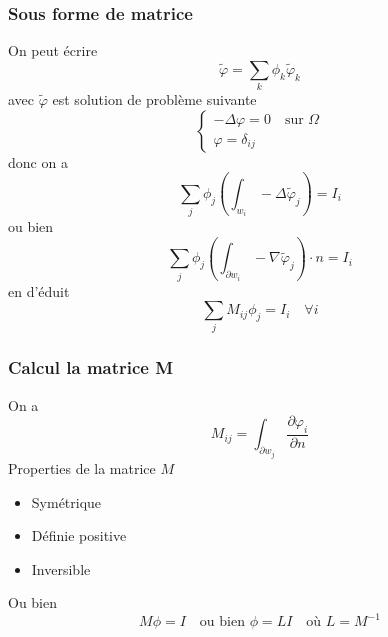 \begin{frame}
\frametitle{Sous forme de matrice}
On peut \'ecrire
 \begin{equation}
   \tilde\varphi = \sum_k \phi_k \tilde{\varphi}_k
 \end{equation}
 avec $\tilde{\varphi}$ est solution de probl\`eme suivante
 \begin{equation}
   \label{eq:2}
 \begin{cases}
 -\Delta{\varphi} = 0 \quad \text{sur } \Omega \\
 {\varphi} = \delta_{ij}
 \end{cases}
 \end{equation}
 donc on a
 \begin{equation}
 \sum_j \phi_j \left( \int_{w_i}-\Delta\tilde{\varphi}_j \right) =I_i
 \end{equation}
 ou bien
 \begin{equation}
  \sum_j \phi_j \left( \int_{\partial w_i}-\nabla\tilde{\varphi}_j \right) \cdot n =I_i
 \end{equation}
 en d'\'eduit
  \begin{equation}
  \sum_j M_{ij}\phi_j =I_i \quad \forall i
 \end{equation}
%


\end{frame}

 \begin{frame}
\frametitle{Calcul la matrice M}
On a
\begin{equation}
  \label{eq:3}
  M_{ij} = \int_{\partial w_j} \frac{\partial\varphi_i}{\partial n}
\end{equation}
 Properties de la matrice $M$
 \begin{itemize}
 \item Sym\'etrique
 \item D\'efinie positive
 \item Inversible
 \end{itemize}
 Ou bien
\begin{equation}
  \label{eq:4}
  M\phi =I \quad \text{ou bien } \phi =LI \quad \text{o\`u } L=M^{-1}
\end{equation}


\end{frame}

